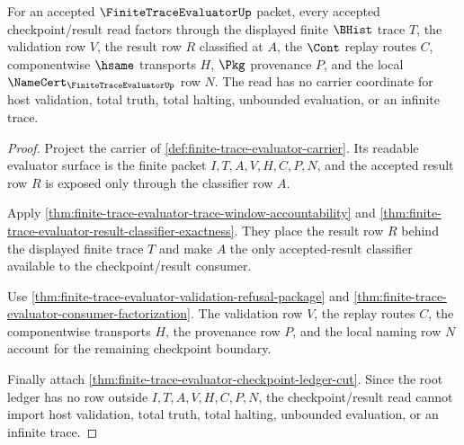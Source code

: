 \begin{theorem}
\label{thm:finite-trace-evaluator-checkpoint-result-totality}
For an accepted $\FiniteTraceEvaluatorUp$ packet, every accepted checkpoint/result read factors through the displayed finite $\BHist$ trace $T$, the validation row $V$, the result row $R$ classified at $A$, the $\Cont$ replay routes $C$, componentwise $\hsame$ transports $H$, $\Pkg$ provenance $P$, and the local $\NameCert_{\FiniteTraceEvaluatorUp}$ row $N$. The read has no carrier coordinate for host validation, total truth, total halting, unbounded evaluation, or an infinite trace.
\end{theorem}
\begin{proof}
Project the carrier of \autoref{def:finite-trace-evaluator-carrier}. Its readable evaluator surface is the finite packet $I,T,A,V,H,C,P,N$, and the accepted result row $R$ is exposed only through the classifier row $A$.

Apply \autoref{thm:finite-trace-evaluator-trace-window-accountability} and \autoref{thm:finite-trace-evaluator-result-classifier-exactness}. They place the result row $R$ behind the displayed finite trace $T$ and make $A$ the only accepted-result classifier available to the checkpoint/result consumer.

Use \autoref{thm:finite-trace-evaluator-validation-refusal-package} and \autoref{thm:finite-trace-evaluator-consumer-factorization}. The validation row $V$, the replay routes $C$, the componentwise transports $H$, the provenance row $P$, and the local naming row $N$ account for the remaining checkpoint boundary.

Finally attach \autoref{thm:finite-trace-evaluator-checkpoint-ledger-cut}. Since the root ledger has no row outside $I,T,A,V,H,C,P,N$, the checkpoint/result read cannot import host validation, total truth, total halting, unbounded evaluation, or an infinite trace.
\end{proof}

